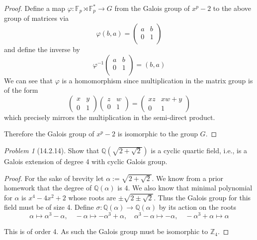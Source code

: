 \documentclass[10pt]{article}
\newcommand{\sk}{\vskip 10mm}
\newcommand{\bb}[1]{\mathbb{#1}}
\theoremstyle{remark}
\newtheorem{problem}{Problem}
\theoremstyle{remark}
\begin{document}
\begin{proof}
  Define a map $\varphi:\bb{F}_p\rtimes\bb{F}_p^*\rightarrow G$ from the Galois
  group of $x^p-2$ to the above group of matrices via
  \[
    \varphi(b,a) = 
    \left(
      \begin{array}{cc}
        a&b\\
        0&1\\
      \end{array}
    \right)
  \]
  and define the inverse by
  \[
    \varphi^{-1}
    \left(
      \begin{array}{cc}
        a&b\\
        0&1\\
      \end{array}
    \right)
    = (b,a)
  \]
  We can see that $\varphi$ is a homomorphism since multiplication in the matrix group is of the form
  \[
    \left(
      \begin{array}{rr}
        x & y \\
        0 & 1
      \end{array}
    \right)
    \left(
      \begin{array}{rr}
        z & w \\
        0 & 1
      \end{array}
    \right)
    =
    \left(
      \begin{array}{rr}
        x z & x w + y \\
        0 & 1
      \end{array}
    \right)
  \]
  which precisely mirrors the multiplication in the semi-direct product.

  Therefore the Galois group of $x^p-2$ is isomorphic to the group $G$.
\end{proof}

\sk

\begin{problem}[14.2.14]
  Show that $\bb{Q}(\sqrt{2+\sqrt{2}})$ is a cyclic quartic field,
  i.e., is a Galois extension of degree 4 with cyclic Galois group.
\end{problem}

\begin{proof}
  For the sake of brevity let $\alpha:=\sqrt{2+\sqrt{2}}$.
  We know from a prior homework that the degree of $\bb{Q}(\alpha)$
  is $4$. We also know that minimal polynomial for $\alpha$ is
  $x^4-4x^2+2$ whose roots are $\pm\sqrt{2\pm\sqrt{2}}$. Thus the Galois group
  for this field must be of size 4. Define $\sigma:\bb{Q}(\alpha)\rightarrow\bb{Q}(\alpha)$ by
  its action on the roots
  \[\alpha\mapsto\alpha^3-\alpha,\quad-\alpha\mapsto-\alpha^3+\alpha,\quad\alpha^3-\alpha\mapsto-\alpha,\quad-\alpha^3+\alpha\mapsto\alpha \]

  This is of order 4. As such the Galois group must be isomorphic to
  $\bb{Z}_4$.
\end{proof}

\sk

\end{document}
